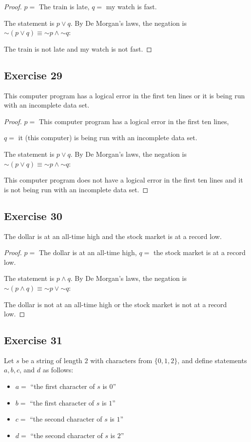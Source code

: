 \documentclass[14pt]{extarticle}
\begin{document}
\begin{proof}
$p =$ The train is late, $q =$ my watch is fast.

The statement is $p \vee q$. By De Morgan's laws, the negation is $\sim(p \vee
q) \equiv {\sim p} \wedge {\sim q}$:

The train is not late and my watch is not fast.
\end{proof}

\subsection{Exercise 29}
This computer program has a logical error in the first ten lines or it is being
run with an incomplete data set.

\begin{proof}
$p =$ This computer program has a logical error in the first ten lines,

$q =$ it (this computer) is being run with an incomplete data set.

The statement is $p \vee q$. By De Morgan's laws, the negation is $\sim(p \vee
q) \equiv {\sim p} \wedge {\sim q}$:

This computer program does not have a logical error in the first ten lines and
it is not being run with an incomplete data set.
\end{proof}

\subsection{Exercise 30}
The dollar is at an all-time high and the stock market is at a record low.

\begin{proof}
$p =$ The dollar is at an all-time high, $q =$ the stock market is at a record
low.

The statement is $p \wedge q$. By De Morgan's laws, the negation is $\sim(p
\wedge q) \equiv {\sim p} \vee {\sim q}$:

The dollar is not at an all-time high or the stock market is not at a record
low.
\end{proof}

\subsection{Exercise 31}
Let $s$ be a string of length $2$ with characters from $\{0, 1, 2\}$, and define
statements $a, b, c$, and $d$ as follows:

\begin{itemize}
\item $a = $ ``the first character of $s$ is $0$''
\item $b = $ ``the first character of $s$ is $1$''
\item $c = $ ``the second character of $s$ is $1$''
\item $d = $ ``the second character of $s$ is $2$''
\end{itemize}
\end{document}
